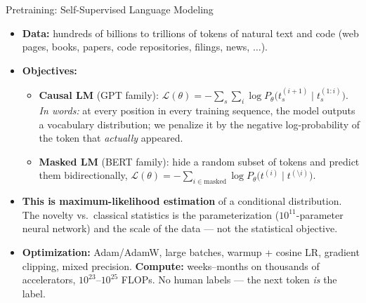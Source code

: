 \documentclass[10pt,english,aspectratio=169]{beamer}
\begin{document}
\begin{frame}{Pretraining: Self-Supervised Language Modeling}
\begin{itemize}
\item \textbf{Data:} hundreds of billions to trillions of tokens of natural text and code (web pages, books, papers, code repositories, filings, news, $\ldots$).

\medskip
\item \textbf{Objectives:}
\begin{itemize}
    \item \textbf{Causal LM} (GPT family): $\mathcal{L}(\theta) = -\sum_{s}\sum_{i} \log P_{\theta}\bigl(t_{s}^{(i+1)} \mid t_{s}^{(1:i)}\bigr)$.
    \emph{In words:} at every position in every training sequence, the model outputs a vocabulary distribution; we penalize it by the negative log-probability of the token that \emph{actually} appeared.
    \item \textbf{Masked LM} (BERT family): hide a random subset of tokens and predict them bidirectionally, $\mathcal{L}(\theta) = -\sum_{i \in \text{masked}} \log P_{\theta}\bigl(t^{(i)} \mid t^{(\setminus i)}\bigr)$.
\end{itemize}

\medskip
\item \textbf{This is maximum-likelihood estimation} of a conditional distribution. The novelty vs.\ classical statistics is the parameterization ($10^{11}$-parameter neural network) and the scale of the data --- not the statistical objective.

\medskip
\item \textbf{Optimization:} Adam/AdamW, large batches, warmup + cosine LR, gradient clipping, mixed precision. \textbf{Compute:} weeks--months on thousands of accelerators, $10^{23}$--$10^{25}$ FLOPs. No human labels --- the next token \emph{is} the label.
\end{itemize}
\end{frame}
\end{document}
